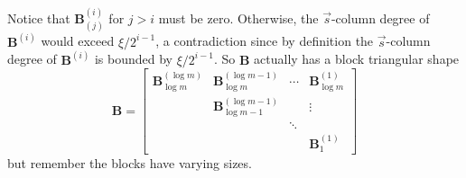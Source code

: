 \begin{pf}
Notice that $\mathbf{B}_{(j)}^{(i)}$ for $j>i$ must be zero. Otherwise,
the $\vec{s}$-column degree of $\mathbf{B}^{(i)}$ would exceed $\xi/2^{i-1}$,
a contradiction since by definition the $\vec{s}$-column degree of
$\mathbf{B}^{(i)}$ is bounded by $\xi/2^{i-1}$. So $\mathbf{B}$
actually has a block triangular shape 
\[
\mathbf{B}=\left[\begin{array}{cccc}
\mathbf{B}_{\log m}^{\left(\log m\right)} & \mathbf{B}_{\log m}^{\left(\log m-1\right)} & \cdots & \mathbf{B}_{\log m}^{\left(1\right)}\\
 & \mathbf{B}_{\log m-1}^{\left(\log m-1\right)} &  & \vdots\\
 &  & \ddots\\
 &  &  & \mathbf{B}_{1}^{\left(1\right)}
\end{array}\right]
\]
 but remember the blocks have varying sizes.


\end{pf}
